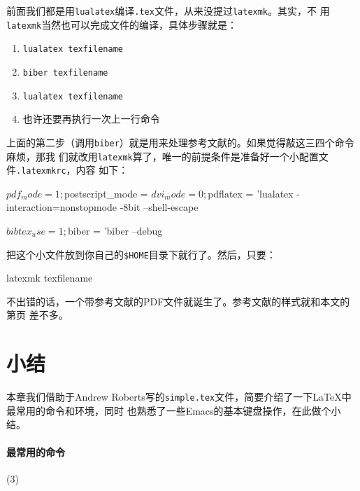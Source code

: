 前面我们都是用\texttt{lualatex}编译\texttt{.tex}文件，从来没提过\texttt{latexmk}。其实，不
用\texttt{latexmk}当然也可以完成文件的编译，具体步骤就是：
\vspace{-3ex}
\begin{singlespace}
  \begin{enumerate}
  \item \texttt{lualatex texfilename}
  \item \texttt{biber texfilename}
  \item \texttt{lualatex texfilename}
  \item 也许还要再执行一次上一行命令
  \end{enumerate}
\end{singlespace}
上面的第二步（调用\texttt{biber}）就是用来处理参考文献的。如果觉得敲这三四个命令麻烦，那我
们就改用\texttt{latexmk}算了，唯一的前提条件是准备好一个小配置文件\texttt{.latexmkrc}，内容
如下：
\begin{codeblock}[.9]
\begin{shellcode}
$pdf_mode = 1; $postscript_mode = $dvi_mode = 0;
$pdflatex = 'lualatex -interaction=nonstopmode -8bit --shell-escape %

$bibtex_use = 1;
$biber = 'biber --debug %
\end{shellcode}
\end{codeblock}

把这个小文件放到你自己的\verb|$HOME|目录下就行了。然后，只要：

\begin{codeblock}[.9]
  \begin{shellcode}
    latexmk texfilename
  \end{shellcode}
\end{codeblock}
不出错的话，一个带参考文献的PDF文件就诞生了。参考文献的样式就和本文的第\pageref{p:ref}页
差不多。

\section{小结}

本章我们借助于Andrew Roberts写的\texttt{simple.tex}文件，简要介绍了一下\LaTeX{}中最常用的命令和环境，同时
也熟悉了一些Emacs的基本键盘操作，在此做个小结。

\paragraph{最常用的命令}

\begin{tasks}(3)
\task[] \ltx{\title{}}
\task[] \ltx{\author{}}
\task[] \ltx{\date{}}
\task[] \ltx{\section{}}
\task[] \ltx{\subsection{}}
\task[] \ltx{\subsubsection{}}
\end{tasks}

